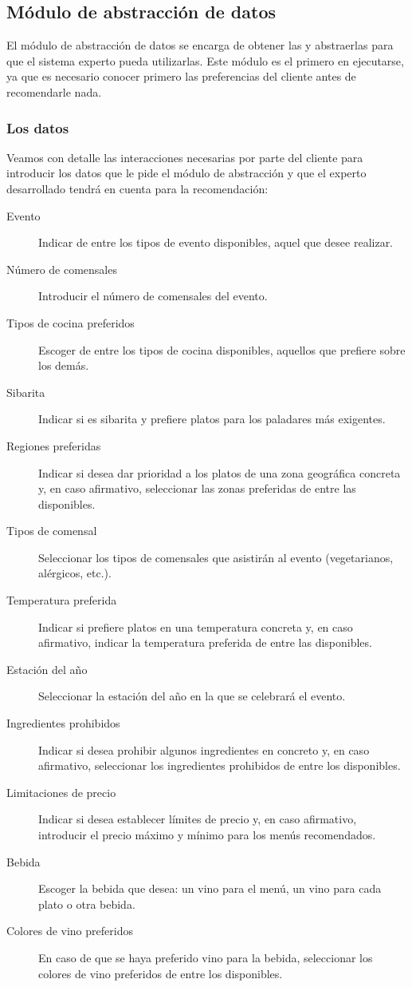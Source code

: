 % 

\subsection{Módulo de abstracción de datos}
El módulo de abstracción de datos se encarga de obtener las  y abstraerlas para que el sistema experto
pueda utilizarlas. Este módulo es el primero en ejecutarse, ya que es necesario conocer primero las preferencias del cliente
antes de recomendarle nada.

\subsubsection{Los datos}
\label{abstraccion-datos}
Veamos con detalle las interacciones necesarias por parte del cliente para introducir los datos que le pide el módulo de abstracción
y que el experto desarrollado tendrá en cuenta para la recomendación:

\begin{description}
\item[Evento] Indicar de entre los tipos de evento disponibles, aquel que desee realizar.
\item[Número de comensales] Introducir el número de comensales del evento.
\item[Tipos de cocina preferidos] Escoger de entre los tipos de cocina disponibles, aquellos que prefiere sobre los demás.
\item[Sibarita] Indicar si es sibarita y prefiere platos para los paladares más exigentes.
\item[Regiones preferidas] Indicar si desea dar prioridad a los platos de una zona geográfica concreta y, en caso afirmativo, seleccionar
las zonas preferidas de entre las disponibles.
\item[Tipos de comensal] Seleccionar los tipos de comensales que asistirán al evento (vegetarianos, alérgicos, etc.).
\item[Temperatura preferida] Indicar si prefiere platos en una temperatura concreta y, en caso afirmativo, indicar la temperatura preferida de entre las disponibles.
\item[Estación del año] Seleccionar la estación del año en la que se celebrará el evento.
\item[Ingredientes prohibidos] Indicar si desea prohibir algunos ingredientes en concreto y, en caso afirmativo, seleccionar los
ingredientes prohibidos de entre los disponibles.
\item[Limitaciones de precio] Indicar si desea establecer límites de precio y, en caso afirmativo, introducir el precio máximo y
mínimo para los menús recomendados.
\item[Bebida] Escoger la bebida que desea: un vino para el menú, un vino para cada plato o otra bebida.
\item[Colores de vino preferidos] En caso de que se haya preferido vino para la bebida, seleccionar los colores de vino preferidos de
entre los disponibles.
\end{description}

